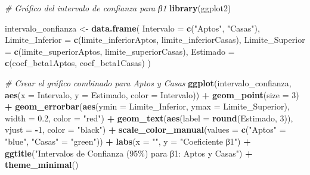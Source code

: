 \documentclass[
]{article}
\newenvironment{Shaded}{\begin{snugshade}}{\end{snugshade}}
\newcommand{\AttributeTok}[1]{\textcolor[rgb]{0.13,0.29,0.53}{#1}}
\newcommand{\CommentTok}[1]{\textcolor[rgb]{0.56,0.35,0.01}{\textit{#1}}}
\newcommand{\DecValTok}[1]{\textcolor[rgb]{0.00,0.00,0.81}{#1}}
\newcommand{\FloatTok}[1]{\textcolor[rgb]{0.00,0.00,0.81}{#1}}
\newcommand{\FunctionTok}[1]{\textcolor[rgb]{0.13,0.29,0.53}{\textbf{#1}}}
\newcommand{\NormalTok}[1]{#1}
\newcommand{\OtherTok}[1]{\textcolor[rgb]{0.56,0.35,0.01}{#1}}
\newcommand{\SpecialCharTok}[1]{\textcolor[rgb]{0.81,0.36,0.00}{\textbf{#1}}}
\newcommand{\StringTok}[1]{\textcolor[rgb]{0.31,0.60,0.02}{#1}}
\begin{document}
\begin{Shaded}
\begin{Highlighting}[]
\CommentTok{\# Gráfico del intervalo de confianza para β1}
\FunctionTok{library}\NormalTok{(ggplot2)}

\NormalTok{intervalo\_confianza }\OtherTok{\textless{}{-}} \FunctionTok{data.frame}\NormalTok{(}
  \AttributeTok{Intervalo =} \FunctionTok{c}\NormalTok{(}\StringTok{"Aptos"}\NormalTok{, }\StringTok{"Casas"}\NormalTok{), }
  \AttributeTok{Limite\_Inferior =} \FunctionTok{c}\NormalTok{(limite\_inferiorAptos, limite\_inferiorCasas), }
  \AttributeTok{Limite\_Superior =} \FunctionTok{c}\NormalTok{(limite\_superiorAptos, limite\_superiorCasas),}
  \AttributeTok{Estimado =} \FunctionTok{c}\NormalTok{(coef\_beta1Aptos, coef\_beta1Casas)}
\NormalTok{)}

\CommentTok{\# Crear el gráfico combinado para Aptos y Casas}
\FunctionTok{ggplot}\NormalTok{(intervalo\_confianza, }\FunctionTok{aes}\NormalTok{(}\AttributeTok{x =}\NormalTok{ Intervalo, }\AttributeTok{y =}\NormalTok{ Estimado, }\AttributeTok{color =}\NormalTok{ Intervalo)) }\SpecialCharTok{+}
  \FunctionTok{geom\_point}\NormalTok{(}\AttributeTok{size =} \DecValTok{3}\NormalTok{) }\SpecialCharTok{+}
  \FunctionTok{geom\_errorbar}\NormalTok{(}\FunctionTok{aes}\NormalTok{(}\AttributeTok{ymin =}\NormalTok{ Limite\_Inferior, }\AttributeTok{ymax =}\NormalTok{ Limite\_Superior), }\AttributeTok{width =} \FloatTok{0.2}\NormalTok{, }\AttributeTok{color =} \StringTok{"red"}\NormalTok{) }\SpecialCharTok{+}
  \FunctionTok{geom\_text}\NormalTok{(}\FunctionTok{aes}\NormalTok{(}\AttributeTok{label =} \FunctionTok{round}\NormalTok{(Estimado, }\DecValTok{3}\NormalTok{)), }\AttributeTok{vjust =} \SpecialCharTok{{-}}\DecValTok{1}\NormalTok{, }\AttributeTok{color =} \StringTok{"black"}\NormalTok{) }\SpecialCharTok{+}
  \FunctionTok{scale\_color\_manual}\NormalTok{(}\AttributeTok{values =} \FunctionTok{c}\NormalTok{(}\StringTok{"Aptos"} \OtherTok{=} \StringTok{"blue"}\NormalTok{, }\StringTok{"Casas"} \OtherTok{=} \StringTok{"green"}\NormalTok{)) }\SpecialCharTok{+}
  \FunctionTok{labs}\NormalTok{(}\AttributeTok{x =} \StringTok{""}\NormalTok{, }\AttributeTok{y =} \StringTok{"Coeficiente β1"}\NormalTok{) }\SpecialCharTok{+}
  \FunctionTok{ggtitle}\NormalTok{(}\StringTok{"Intervalos de Confianza (95\%) para β1: Aptos y Casas"}\NormalTok{) }\SpecialCharTok{+}
  \FunctionTok{theme\_minimal}\NormalTok{()}
\end{Highlighting}
\end{Shaded}
\end{document}
